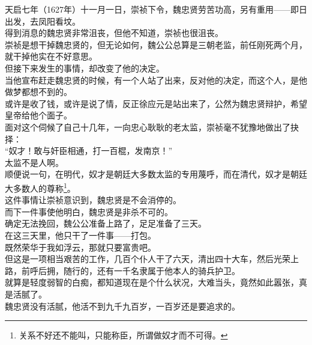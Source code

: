 \begin{multicols}{\theparacolNo}
天启七年（1627年）十一月一日，崇祯下令，魏忠贤劳苦功高，另有重用——即日出发，去凤阳看坟。\\

得到消息的魏忠贤非常沮丧，但他不知道，崇祯也很沮丧。\\

崇祯是想干掉魏忠贤的，但无论如何，魏公公总算是三朝老监，前任刚死两个月，就干掉他实在不好意思。\\

但接下来发生的事情，却改变了他的决定。\\

当他宣布赶走魏忠贤的时候，有一个人站了出来，反对他的决定，而这个人，是他做梦都想不到的。\\

或许是收了钱，或许是说了情，反正徐应元是站出来了，公然为魏忠贤辩护，希望皇帝给他个面子。\\

面对这个伺候了自己十几年，一向忠心耿耿的老太监，崇祯毫不犹豫地做出了抉择：\\

“奴才！敢与奸臣相通，打一百棍，发南京！”\\

太监不是人啊。\\

顺便说一句，在明代，奴才是朝廷大多数太监的专用蔑呼，而在清代，奴才是朝廷大多数人的尊称\footnote{关系不好还不能叫，只能称臣，所谓做奴才而不可得。}。\\

这件事情让崇祯意识到，魏忠贤是不会消停的。\\

而下一件事使他明白，魏忠贤是非杀不可的。\\

确定无法挽回，魏公公准备上路了，足足准备了三天。\\

在这三天里，他只干了一件事——打包。\\

既然荣华于我如浮云，那就只要富贵吧。\\

但这是一项相当艰苦的工作，几百个仆人干了六天，清出四十大车，然后光荣上路，前呼后拥，随行的，还有一千名隶属于他本人的骑兵护卫。\\

就算是轻度弱智的白痴，都知道现在是个什么状况，大难当头，竟然如此嚣张，真是活腻了。\\

魏忠贤没有活腻，他活不到九千九百岁，一百岁还是要追求的。\\


\end{multicols}
